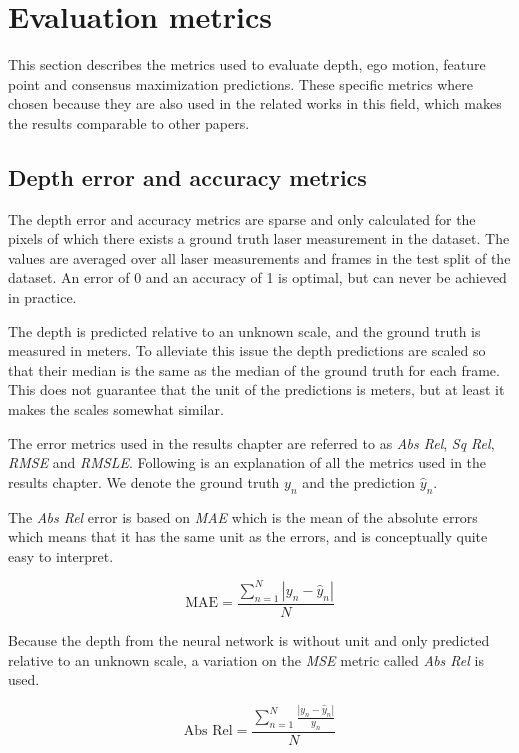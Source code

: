 \section{Evaluation metrics}\label{sec:metrics}

This section describes the metrics used to evaluate depth, ego motion, feature point and consensus maximization predictions. These specific metrics where chosen because they are also used in the related works in this field, which makes the results comparable to other papers.

\subsection{Depth error and accuracy metrics}
\label{sec:depthmetrics}

The depth error and accuracy metrics are sparse and only calculated for the pixels of which there exists a ground truth laser measurement in the dataset. The values are averaged over all laser measurements and frames in the test split of the dataset. An error of 0 and an accuracy of 1 is optimal, but can never be achieved in practice.

The depth is predicted relative to an unknown scale, and the ground truth is measured in meters. To alleviate this issue the depth predictions are scaled so that their median is the same as the median of the ground truth for each frame. This does not guarantee that the unit of the predictions is meters, but at least it makes the scales somewhat similar.

The error metrics used in the results chapter are referred to as \textit{Abs Rel}, \textit{Sq Rel}, \textit{RMSE} and \textit{RMSLE}. Following is an explanation of all the metrics used in the results chapter. We denote the ground truth $y_n$ and the prediction $\hat{y}_n$.

The \textit{Abs Rel} error is based on \textit{MAE} which is the mean of the absolute errors which means that it has the same unit as the errors, and is conceptually quite easy to interpret.

\begin{equation}
\textrm{MAE}=\frac{\sum^N_{n=1}{|y_n-\hat{y}_n|}}{N}
\end{equation}

Because the depth from the neural network is without unit and only predicted relative to an unknown scale, a variation on the \textit{MSE} metric called \textit{Abs Rel} is used.

\begin{equation}
\textrm{Abs Rel}=\frac{\sum^N_{n=1}{\frac{|y_n-\hat{y}_n|}{y_n}}}{N}
\end{equation}

